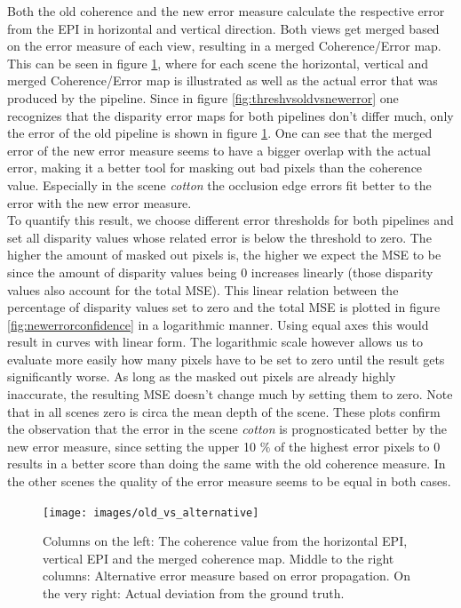\documentclass  [
  paper    = a4,
  BCOR     = 10mm,
  twoside,
  fontsize = 12pt,
  fleqn,
  toc      = bibnumbered,
  toc      = listofnumbered,
  numbers  = noendperiod,
  headings = normal,
  listof   = leveldown,
  version  = 3.03
]                                       {scrreprt}
\begin{document}
Both the old coherence and the new error measure calculate the respective error from the EPI in horizontal and vertical direction. Both views get merged based on the error measure of each view, resulting in a merged Coherence/Error map. This can be seen in figure \ref{fig:oldvsalternative}, where for each scene the horizontal, vertical and merged Coherence/Error map is illustrated as well as the actual error that was produced by the pipeline. Since in figure \ref{fig:threshvsoldvsnewerror} one recognizes that the disparity error maps for both pipelines don't differ much, only the error of the old pipeline is shown in figure \ref{fig:oldvsalternative}. One can see that the merged error of the new error measure seems to have a bigger overlap with the actual error, making it a better tool for masking out bad pixels than the coherence value. Especially in the scene \textit{cotton} the occlusion edge errors fit better to the error with the new error measure.\\
To quantify this result, we choose different error thresholds for both pipelines and set all disparity values whose related error is below the threshold to zero. The higher the amount of masked out pixels is, the higher we expect the MSE to be since the amount of disparity values being 0 increases linearly (those disparity values also account for the total MSE). This linear relation between the percentage of disparity values set to zero and the total MSE is plotted in figure \ref{fig:newerrorconfidence} in a logarithmic manner. Using equal axes this would result in curves with linear form. The logarithmic scale however allows us to evaluate more easily how many pixels have to be set to zero until the result gets significantly worse. As long as the masked out pixels are already highly inaccurate, the resulting MSE doesn't change much by setting them to zero. Note that in all scenes zero is circa the mean depth of the scene. These plots confirm the observation that the error in the scene \textit{cotton} is prognosticated better by the new error measure, since setting the upper 10 $\%$ of the highest error pixels to 0 results in a better score than doing the same with the old coherence measure. In the other scenes the quality of the error measure seems to be equal in both cases. 
\begin{figure}
	\centering
	\texttt{[image: images/old\_vs\_alternative]}
	\caption[Old error vs New Error]{Columns on the left: The coherence value from the horizontal EPI, vertical EPI and the merged coherence map. Middle to the right columns: Alternative error measure based on error propagation. On the very right: Actual deviation from the ground truth.}
	\label{fig:oldvsalternative}
\end{figure}
\end{document}

